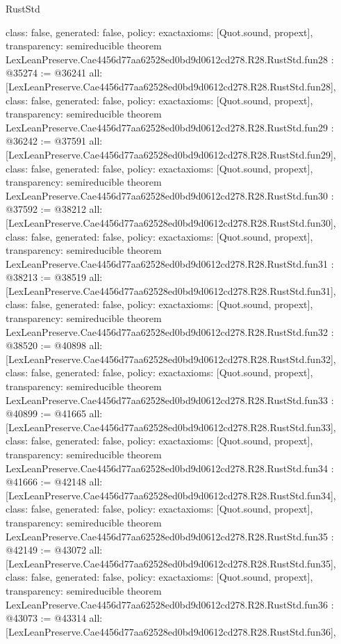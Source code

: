 \begin{lexlean}{RustStd}
\begin{coremodule}
{  class: false,
  generated: false,
  policy: exact{axioms: [Quot.sound, propext]},
  transparency: semireducible
}
theorem LexLeanPreserve.Cae4456d77aa62528ed0bd9d0612cd278.R28.RustStd.fun28 : @35274 := @36241 {
  all: [LexLeanPreserve.Cae4456d77aa62528ed0bd9d0612cd278.R28.RustStd.fun28],
  class: false,
  generated: false,
  policy: exact{axioms: [Quot.sound, propext]},
  transparency: semireducible
}
theorem LexLeanPreserve.Cae4456d77aa62528ed0bd9d0612cd278.R28.RustStd.fun29 : @36242 := @37591 {
  all: [LexLeanPreserve.Cae4456d77aa62528ed0bd9d0612cd278.R28.RustStd.fun29],
  class: false,
  generated: false,
  policy: exact{axioms: [Quot.sound, propext]},
  transparency: semireducible
}
theorem LexLeanPreserve.Cae4456d77aa62528ed0bd9d0612cd278.R28.RustStd.fun30 : @37592 := @38212 {
  all: [LexLeanPreserve.Cae4456d77aa62528ed0bd9d0612cd278.R28.RustStd.fun30],
  class: false,
  generated: false,
  policy: exact{axioms: [Quot.sound, propext]},
  transparency: semireducible
}
theorem LexLeanPreserve.Cae4456d77aa62528ed0bd9d0612cd278.R28.RustStd.fun31 : @38213 := @38519 {
  all: [LexLeanPreserve.Cae4456d77aa62528ed0bd9d0612cd278.R28.RustStd.fun31],
  class: false,
  generated: false,
  policy: exact{axioms: [Quot.sound, propext]},
  transparency: semireducible
}
theorem LexLeanPreserve.Cae4456d77aa62528ed0bd9d0612cd278.R28.RustStd.fun32 : @38520 := @40898 {
  all: [LexLeanPreserve.Cae4456d77aa62528ed0bd9d0612cd278.R28.RustStd.fun32],
  class: false,
  generated: false,
  policy: exact{axioms: [Quot.sound, propext]},
  transparency: semireducible
}
theorem LexLeanPreserve.Cae4456d77aa62528ed0bd9d0612cd278.R28.RustStd.fun33 : @40899 := @41665 {
  all: [LexLeanPreserve.Cae4456d77aa62528ed0bd9d0612cd278.R28.RustStd.fun33],
  class: false,
  generated: false,
  policy: exact{axioms: [Quot.sound, propext]},
  transparency: semireducible
}
theorem LexLeanPreserve.Cae4456d77aa62528ed0bd9d0612cd278.R28.RustStd.fun34 : @41666 := @42148 {
  all: [LexLeanPreserve.Cae4456d77aa62528ed0bd9d0612cd278.R28.RustStd.fun34],
  class: false,
  generated: false,
  policy: exact{axioms: [Quot.sound, propext]},
  transparency: semireducible
}
theorem LexLeanPreserve.Cae4456d77aa62528ed0bd9d0612cd278.R28.RustStd.fun35 : @42149 := @43072 {
  all: [LexLeanPreserve.Cae4456d77aa62528ed0bd9d0612cd278.R28.RustStd.fun35],
  class: false,
  generated: false,
  policy: exact{axioms: [Quot.sound, propext]},
  transparency: semireducible
}
theorem LexLeanPreserve.Cae4456d77aa62528ed0bd9d0612cd278.R28.RustStd.fun36 : @43073 := @43314 {
  all: [LexLeanPreserve.Cae4456d77aa62528ed0bd9d0612cd278.R28.RustStd.fun36],
}
\end{coremodule}
\end{lexlean}
